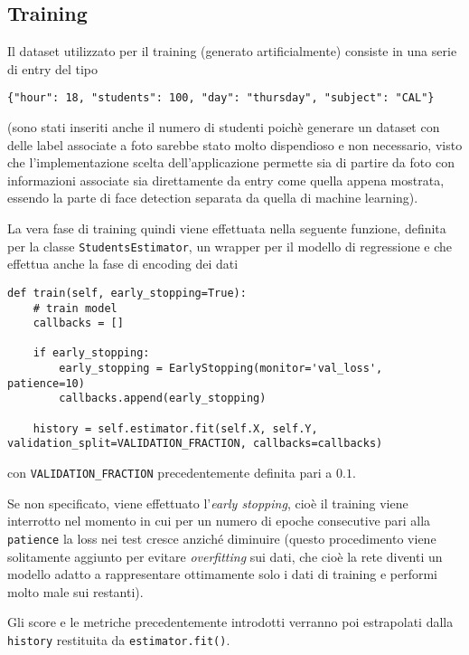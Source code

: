 \subsection{Training} %
\label{sub:methods_ml_training}

Il dataset utilizzato per il training (generato artificialmente) consiste in una serie di entry del 
tipo

\begin{verbatim}
{"hour": 18, "students": 100, "day": "thursday", "subject": "CAL"}
\end{verbatim} 

(sono stati inseriti anche il numero di studenti poichè generare un dataset con delle label 
associate a foto sarebbe stato molto dispendioso e non necessario, visto che l'implementazione
scelta dell'applicazione permette sia di partire da foto con informazioni associate sia direttamente 
da entry come quella appena mostrata, essendo la parte di face detection separata da quella di 
machine learning).

La vera fase di training quindi viene effettuata nella seguente funzione, definita per la classe 
\lstinline{StudentsEstimator}, un wrapper per il modello di regressione e che effettua anche la fase
di encoding dei dati

\begin{verbatim}
def train(self, early_stopping=True):
    # train model
    callbacks = []

    if early_stopping:
        early_stopping = EarlyStopping(monitor='val_loss', patience=10)
        callbacks.append(early_stopping)

    history = self.estimator.fit(self.X, self.Y, validation_split=VALIDATION_FRACTION, callbacks=callbacks)
\end{verbatim} 
\noindent
con \lstinline{VALIDATION_FRACTION} precedentemente definita pari a $0.1$. 

Se non specificato, viene effettuato l'\textit{early stopping}, cioè il training viene interrotto 
nel momento in cui per un numero di epoche consecutive pari alla \lstinline{patience} la loss nei test 
cresce anziché diminuire (questo procedimento viene solitamente aggiunto per evitare \textit{overfitting} 
sui dati, che cioè la rete diventi un modello adatto a rappresentare ottimamente solo i dati di training
e performi molto male sui restanti). 

Gli score e le metriche precedentemente introdotti verranno poi estrapolati dalla \lstinline{history} 
restituita da \lstinline{estimator.fit()}.


